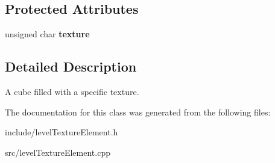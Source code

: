 \subsection*{\-Protected \-Attributes}
\begin{DoxyCompactItemize}
\item 
\hypertarget{classLevelTextureElementSolidCube_a8b85234a77fa17ba12a10181589801ba}{
unsigned char {\bfseries texture}}
\label{d5/d61/classLevelTextureElementSolidCube_a8b85234a77fa17ba12a10181589801ba}

\end{DoxyCompactItemize}


\subsection{\-Detailed \-Description}
\-A cube filled with a specific texture. 

\-The documentation for this class was generated from the following files\-:\begin{DoxyCompactItemize}
\item 
include/level\-Texture\-Element.\-h\item 
src/level\-Texture\-Element.\-cpp\end{DoxyCompactItemize}
